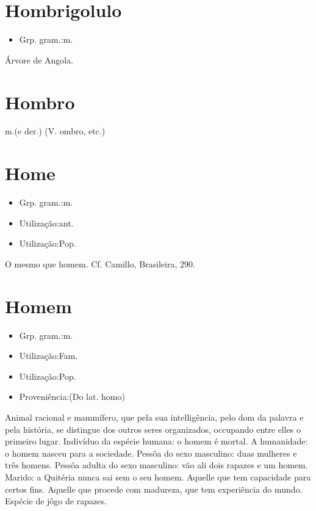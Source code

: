 \documentclass{article}
\begin{document}
\section{Hombrigolulo}
\begin{itemize}
\item {Grp. gram.:m.}
\end{itemize}
Árvore de Angola.
\section{Hombro}
\textunderscore m.\textunderscore  (e der.)
(V. \textunderscore ombro\textunderscore , etc.)
\section{Home}
\begin{itemize}
\item {Grp. gram.:m.}
\end{itemize}
\begin{itemize}
\item {Utilização:ant.}
\end{itemize}
\begin{itemize}
\item {Utilização:Pop.}
\end{itemize}
O mesmo que \textunderscore homem\textunderscore . Cf. Camillo, \textunderscore Brasileira\textunderscore , 290.
\section{Homem}
\begin{itemize}
\item {Grp. gram.:m.}
\end{itemize}
\begin{itemize}
\item {Utilização:Fam.}
\end{itemize}
\begin{itemize}
\item {Utilização:Pop.}
\end{itemize}
\begin{itemize}
\item {Proveniência:(Do lat. \textunderscore homo\textunderscore )}
\end{itemize}
Animal racional e mammífero, que pela sua intelligência, pelo dom da palavra e pela história, se distingue dos outros seres organizados, occupando entre elles o primeiro lugar.
Indivíduo da espécie humana: \textunderscore o homem é mortal\textunderscore .
A humanidade: \textunderscore o homem nasceu para a sociedade\textunderscore .
Pessôa do sexo masculino: \textunderscore duas mulheres e três homens\textunderscore .
Pessôa adulta do sexo masculino: \textunderscore vão ali dois rapazes e um homem\textunderscore .
Marido: \textunderscore a Quitéria nunca sai sem o seu homem\textunderscore .
Aquelle que tem capacidade para certos fins.
Aquelle que procede com madureza, que tem experiência do mundo.
Espécie de jôgo de rapazes.
\end{document}
